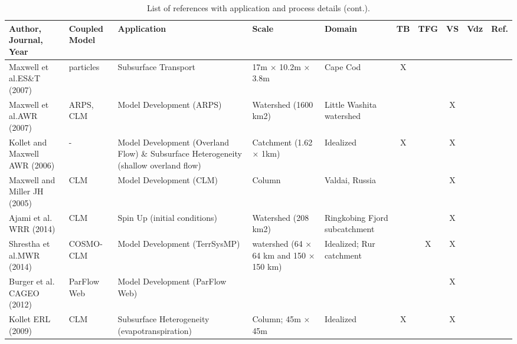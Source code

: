 {\begin{table}
\caption{List of \parflow{} references with application and process details (cont.).}

\begin{tabular}{ l  p{1.5cm} p{2cm} p{1.5cm} p{1.5cm} | c | c | c | c | c }
\bf{Author, Journal, Year} & \bf{Coupled Model} & \bf{Application} & \bf{Scale} & \bf{Domain} & \bf{TB} & \bf{TFG} & \bf{VS} & \bf{Vdz} & \bf{Ref.} \\   
\hline{}

Maxwell et al.ES\&T (2007) & particles & Subsurface Transport & 17m × 10.2m × 3.8m & Cape Cod & X &  &  & & \cite{MWH07}  \\
Maxwell et al.AWR (2007) & ARPS, CLM & Model Development (ARPS) & Watershed (1600 km2) & Little Washita watershed &  &  & X & & \cite{MCK07}  \\
Kollet and Maxwell AWR (2006) & - & Model Development (Overland Flow) \& Subsurface Heterogeneity (shallow overland flow) & Catchment (1.62 × 1km) & Idealized & X &  & X & & \cite{KM06}  \\
Maxwell and Miller JH (2005) & CLM & Model Development (CLM) & Column & Valdai, Russia &  &  & X & & \cite{MM05}  \\
Ajami et al. WRR (2014) & CLM & Spin Up (initial conditions) & Watershed (208 km2) & Ringkobing Fjord subcatchment &  &  & X & & \cite{Ajami14}  \\
Shrestha et al.MWR (2014) & COSMO-CLM & Model Development (TerrSysMP) & watershed (64 × 64 km and 150 × 150 km) & Idealized; Rur catchment &  & X & X & & \cite{KM08a} \\
Burger et al. CAGEO (2012) & ParFlow Web & Model Development (ParFlow Web)&  &  & &  & X &  & \cite{Burger12}  \\
Kollet ERL (2009) & CLM & Subsurface Heterogeneity (evapotranspiration) & Column; 45m × 45m & Idealized &  X &  & X & & \cite{K09} \\
\end{tabular}
\label{pfref4}
\end{table}

}

